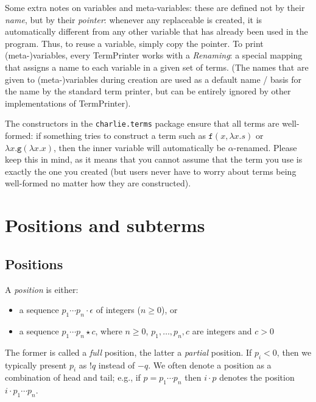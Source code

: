 \documentclass{lmcs}
\theoremstyle{theorem}\newtheorem{theorem}{Theorem}
\theoremstyle{theorem}\newtheorem{lemma}[theorem]{Lemma}
\theoremstyle{theorem}\newtheorem{corollary}[theorem]{Corollary}
\theoremstyle{definition}\newtheorem{definition}[theorem]{Definition}
\theoremstyle{definition}\newtheorem{example}[theorem]{Example}
\newcommand{\identifier}[1]{\mathtt{#1}}
\newcommand{\afun}{\identifier{f}}
\newcommand{\bfun}{\identifier{g}}
\newcommand{\avar}{x}
\newcommand{\abs}[2]{\lambda #1.#2}
\begin{document}
\medskip
Some extra notes on variables and meta-variables: these are defined not by their
\emph{name}, but by their \emph{pointer}: whenever any replaceable is created,
it is automatically different from any other variable that has already been
used in the program.  Thus, to reuse a variable, simply copy the pointer.  To
print (meta-)variables, every TermPrinter works with a \emph{Renaming}: a
special mapping that assigns a name to each variable in a given set of terms.
(The names that are given to (meta-)variables during creation are used as a
default name / basis for the name by the standard term printer, but can be
entirely ignored by other implementations of TermPrinter).

The constructors in the \texttt{charlie.terms} package ensure that all terms
are well-formed: if something tries to construct a term such as $\afun(\avar,
\abs{\avar}{s})$ or $\abs{\avar}{\bfun(\abs{\avar}{\avar})}$, then the inner
variable will automatically be $\alpha$-renamed.  Please keep this in mind, as
it means that you cannot assume that the term you use is exactly the one you
created (but users never have to worry about terms being well-formed no matter
how they are constructed).

\section{Positions and subterms}

\subsection{Positions}

A \emph{position} is either:
\begin{itemize}
\item a sequence $p_1 \cdots p_n \cdot \epsilon$ of integers ($n \geq 0$), or
\item a sequence $p_1 \cdots p_n \star c$, where $n \geq 0$, $p_1,\dots,p_n,c$
  are integers and $c > 0$
\end{itemize}
The former is called a \emph{full} position, the latter a \emph{partial}
position.  If $p_i < 0$, then we typically present $p_i$ as $!q$ instead of
$-q$.  We often denote a position as a combination of head and tail; e.g.,
if $p = p_1 \cdots p_n$ then $i \cdot p$ denotes the position
$i \cdot p_1 \cdots p_n$.
\end{document}
